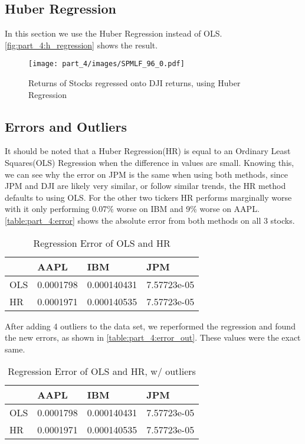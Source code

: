 \subsection{Huber Regression}
In this section we use the Huber Regression instead of OLS. \autoref{fig:part_4:h_regression} shows the result.

\begin{figure}[!htb]
    \centering
    \texttt{[image: part\_4/images/SPMLF\_96\_0.pdf]}
    \caption{Returns of Stocks regressed onto DJI returns, using Huber Regression}
    \label{fig:part_4:h_regression}
\end{figure}

\subsection{Errors and Outliers}

It should be noted that a Huber Regression(HR) is equal to an Ordinary Least Squares(OLS) Regression when the difference in values are small. Knowing this, we can see why the error on JPM is the same when using both methods, since JPM and DJI are likely very similar, or follow similar trends, the HR method defaults to using OLS. For the other two tickers HR performs marginally worse with it only performing 0.07\% worse on IBM and 9\% worse on AAPL. \autoref{table:part_4:error} shows the absolute error from both methods on all 3 stocks.

\begin{table}[!h]
    \centering
    \begin{tabular}{l|l|l|l}
           &  AAPL      & IBM          & JPM     \\ \hline
        OLS &  0.0001798 & 0.000140431  & 7.57723e-05       \\
        HR &  0.0001971 & 0.000140535  & 7.57723e-05
    \end{tabular}
    \caption{Regression Error of OLS and HR}
    \label{table:part_4:error}
\end{table}

After adding 4 outliers to the data set, we reperformed the regression and found the new errors, as shown in \autoref{table:part_4:error_out}. These values were the exact same.

\begin{table}[!h]
    \centering
    \begin{tabular}{l|l|l|l}
           &  AAPL      & IBM          & JPM     \\ \hline
        OLS &  0.0001798 & 0.000140431  & 7.57723e-05       \\
        HR &  0.0001971 & 0.000140535  & 7.57723e-05
    \end{tabular}
    \caption{Regression Error of OLS and HR, w/ outliers}
    \label{table:part_4:error_out}
\end{table}

